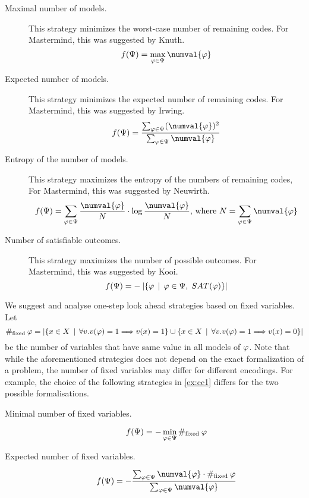 \begin{description}
\item[Maximal number of models.]
This strategy minimizes the worst-case number of remaining codes.
For Mastermind, this was suggested by Knuth\cite{mm-knuth}.
\[
f(\formset) = \max_{\form\in\formset} \numval{\form}
\]

\item[Expected number of models.]
This strategy minimizes the expected number of remaining codes.
  For Mastermind, this was suggested by Irwing\cite{mm-expnum}.
\[
f(\formset) = \frac{\sum_{\form\in\formset}(\numval{\form})^2}{\sum_{\form\in\formset} \numval{\form}}
\]

\item[Entropy of the number of models.]
This strategy maximizes the entropy of the numbers of remaining codes,
For Mastermind, this was suggested by Neuwirth\cite{mm-entropy}.
\[
f(\formset) = \sum_{\form\in\formset} \frac{\numval{\form}}{N} \cdot \log \frac{\numval{\form}}{N}
  \textrm{, where } N = \sum_{\form\in\formset}\numval{\form}
\]

\item[Number of satisfiable outcomes.]
This strategy maximizes the number of possible outcomes.
For Mastermind, this was suggested by Kooi\cite{mm-mostparts}.
\[
f(\Psi) = - \:|\{ \varphi \:\:|\:\: \varphi\in\Psi, \;SAT(\varphi) \}|
\]
\end{description}

\newcommand{\fixed}{\#_\textrm{fixed}\:}
We suggest and analyse one-step look ahead strategies based on fixed variables.
Let
\[
\fixed\form = |\{ x\in\Var \| \forall v.v(\form)=1 ==> v(x)=1 \}
                  \cup\{ x\in\Var \| \forall v.v(\form)=1 ==> v(x)=0 \}|
\]
be the number of variables that have same value in all models of $\varphi$.
Note that while the aforementioned strategies does not depend on the exact
  formalization of a problem, the number of fixed variables may differ for
  different encodings.
For example, the choice of the following strategies in \autoref{ex:cc1} differs
  for the two possible formalisations.

\begin{description}
\item[Minimal number of fixed variables.]
\[
f(\formset) = -\min_{\form\in\formset} \fixed{\form}
\]
\item[Expected number of fixed variables.]
\[
f(\formset) = -\frac{\sum_{\form\in\formset}\numval{\form}\cdot\fixed{\form}}{\sum_{\form\in\formset}\numval{\form}}
\]
\end{description}

